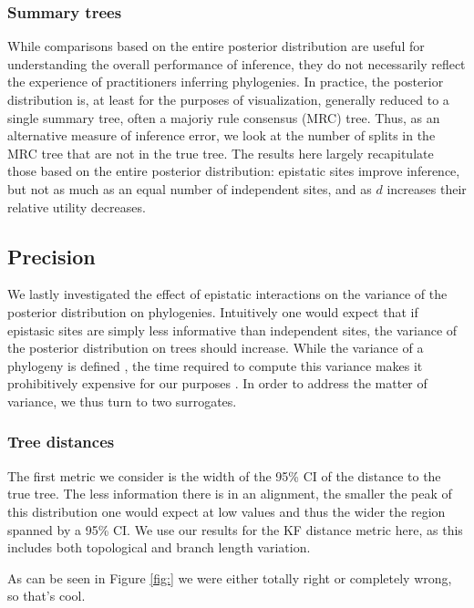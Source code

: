 \documentclass[11pt]{article}
\begin{document}
\subsubsection*{Summary trees\label{sec:point_estimates}}
While comparisons based on the entire posterior distribution are useful for understanding the overall performance of inference, they do not necessarily reflect the experience of practitioners inferring phylogenies.
In practice, the posterior distribution is, at least for the purposes of visualization, generally reduced to a single summary tree, often a majoriy rule consensus (MRC) tree.
Thus, as an alternative measure of inference error, we look at the number of splits in the MRC tree that are not in the true tree.
The results here largely recapitulate those based on the entire posterior distribution: epistatic sites improve inference, but not as much as an equal number of independent sites, and as $d$ increases their relative utility decreases.

\subsection*{Precision\label{sec:variance}}
We lastly investigated the effect of epistatic interactions on the variance of the posterior distribution on phylogenies.
Intuitively one would expect that if epistasic sites are simply less informative than independent sites, the variance of the posterior distribution on trees should increase.
While the variance of a phylogeny is defined \citep[e.g.\ ][]{willis2019confidence}, the time required to compute this variance makes it prohibitively expensive for our purposes \citep{brown2019mean}.
In order to address the matter of variance, we thus turn to two surrogates.

\subsubsection*{Tree distances\label{sec:kf_variance}}
The first metric we consider is the width of the 95\% CI of the distance to the true tree.
The less information there is in an alignment, the smaller the peak of this distribution one would expect at low values and thus the wider the region spanned by a 95\% CI.
We use our results for the KF distance metric here, as this includes both topological and branch length variation.

As can be seen in Figure \ref{fig:} we were either totally right or completely wrong, so that's cool.
\end{document}
